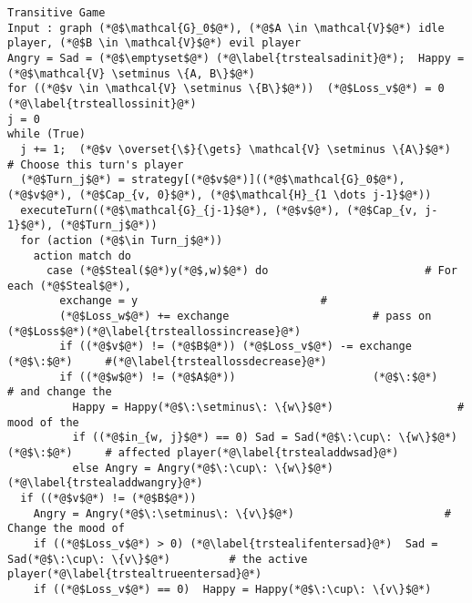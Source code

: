 \begin{lstlisting}[label=transitivegame]
Transitive Game
Input : graph (*@$\mathcal{G}_0$@*), (*@$A \in \mathcal{V}$@*) idle player, (*@$B \in \mathcal{V}$@*) evil player
Angry = Sad = (*@$\emptyset$@*) (*@\label{trstealsadinit}@*);  Happy = (*@$\mathcal{V} \setminus \{A, B\}$@*)
for ((*@$v \in \mathcal{V} \setminus \{B\}$@*))  (*@$Loss_v$@*) = 0 (*@\label{trsteallossinit}@*)
j = 0
while (True)
  j += 1;  (*@$v \overset{\$}{\gets} \mathcal{V} \setminus \{A\}$@*)              # Choose this turn's player
  (*@$Turn_j$@*) = strategy[(*@$v$@*)]((*@$\mathcal{G}_0$@*), (*@$v$@*), (*@$Cap_{v, 0}$@*), (*@$\mathcal{H}_{1 \dots j-1}$@*))
  executeTurn((*@$\mathcal{G}_{j-1}$@*), (*@$v$@*), (*@$Cap_{v, j-1}$@*), (*@$Turn_j$@*))
  for (action (*@$\in Turn_j$@*))
    action match do
      case (*@$Steal($@*)y(*@$,w)$@*) do                        # For each (*@$Steal$@*),
        exchange = y                            #
        (*@$Loss_w$@*) += exchange                      # pass on (*@$Loss$@*)(*@\label{trsteallossincrease}@*)
        if ((*@$v$@*) != (*@$B$@*)) (*@$Loss_v$@*) -= exchange    (*@$\:$@*)     #(*@\label{trsteallossdecrease}@*)
        if ((*@$w$@*) != (*@$A$@*))                     (*@$\:$@*)      # and change the
          Happy = Happy(*@$\:\setminus\: \{w\}$@*)                   # mood of the
          if ((*@$in_{w, j}$@*) == 0) Sad = Sad(*@$\:\cup\: \{w\}$@*)  (*@$\:$@*)     # affected player(*@\label{trstealaddwsad}@*)
          else Angry = Angry(*@$\:\cup\: \{w\}$@*)   (*@\label{trstealaddwangry}@*)
  if ((*@$v$@*) != (*@$B$@*))
    Angry = Angry(*@$\:\setminus\: \{v\}$@*)                       # Change the mood of
    if ((*@$Loss_v$@*) > 0) (*@\label{trstealifentersad}@*)  Sad = Sad(*@$\:\cup\: \{v\}$@*)         # the active player(*@\label{trstealtrueentersad}@*)
    if ((*@$Loss_v$@*) == 0)  Happy = Happy(*@$\:\cup\: \{v\}$@*)
\end{lstlisting}
